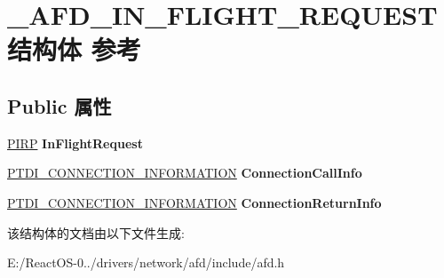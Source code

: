 \hypertarget{struct___a_f_d___i_n___f_l_i_g_h_t___r_e_q_u_e_s_t}{}\section{\+\_\+\+A\+F\+D\+\_\+\+I\+N\+\_\+\+F\+L\+I\+G\+H\+T\+\_\+\+R\+E\+Q\+U\+E\+S\+T结构体 参考}
\label{struct___a_f_d___i_n___f_l_i_g_h_t___r_e_q_u_e_s_t}
\subsection*{Public 属性}
\begin{DoxyCompactItemize}
\item 
\mbox{\label{struct___a_f_d___i_n___f_l_i_g_h_t___r_e_q_u_e_s_t_a75b7de0c91957be3dcb251b426f6e188}} 
\hyperlink{interfacevoid}{P\+I\+RP} {\bfseries In\+Flight\+Request}
\item 
\mbox{\label{struct___a_f_d___i_n___f_l_i_g_h_t___r_e_q_u_e_s_t_a17599d5f069a4220ecb2b2eceb464967}} 
\hyperlink{struct___t_d_i___c_o_n_n_e_c_t_i_o_n___i_n_f_o_r_m_a_t_i_o_n}{P\+T\+D\+I\+\_\+\+C\+O\+N\+N\+E\+C\+T\+I\+O\+N\+\_\+\+I\+N\+F\+O\+R\+M\+A\+T\+I\+ON} {\bfseries Connection\+Call\+Info}
\item 
\mbox{\label{struct___a_f_d___i_n___f_l_i_g_h_t___r_e_q_u_e_s_t_a08b9b15b9698d825b9f9894a324df87c}} 
\hyperlink{struct___t_d_i___c_o_n_n_e_c_t_i_o_n___i_n_f_o_r_m_a_t_i_o_n}{P\+T\+D\+I\+\_\+\+C\+O\+N\+N\+E\+C\+T\+I\+O\+N\+\_\+\+I\+N\+F\+O\+R\+M\+A\+T\+I\+ON} {\bfseries Connection\+Return\+Info}
\end{DoxyCompactItemize}


该结构体的文档由以下文件生成\+:\begin{DoxyCompactItemize}
\item 
E\+:/\+React\+O\+S-\/0../drivers/network/afd/include/afd.\+h\end{DoxyCompactItemize}
